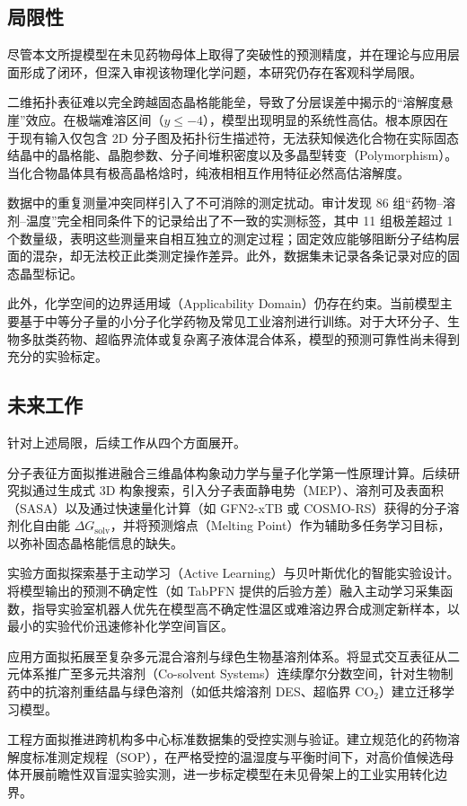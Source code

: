 \subsection{局限性}

尽管本文所提模型在未见药物母体上取得了突破性的预测精度，并在理论与应用层面形成了闭环，但深入审视该物理化学问题，本研究仍存在客观科学局限。

二维拓扑表征难以完全跨越固态晶格能能垒，导致了分层误差中揭示的“溶解度悬崖”效应。在极端难溶区间（$y \leqslant -4$），模型出现明显的系统性高估。根本原因在于现有输入仅包含 2D 分子图及拓扑衍生描述符，无法获知候选化合物在实际固态结晶中的晶格能、晶胞参数、分子间堆积密度以及多晶型转变（Polymorphism）。当化合物晶体具有极高晶格焓时，纯液相相互作用特征必然高估溶解度。

数据中的重复测量冲突同样引入了不可消除的测定扰动。审计发现 86 组“药物--溶剂--温度”完全相同条件下的记录给出了不一致的实测标签，其中 11 组极差超过 1 个数量级，表明这些测量来自相互独立的测定过程；固定效应能够阻断分子结构层面的混杂，却无法校正此类测定操作差异。此外，数据集未记录各条记录对应的固态晶型标记。

此外，化学空间的边界适用域（Applicability Domain）仍存在约束。当前模型主要基于中等分子量的小分子化学药物及常见工业溶剂进行训练。对于大环分子、生物多肽类药物、超临界流体或复杂离子液体混合体系，模型的预测可靠性尚未得到充分的实验标定。

\subsection{未来工作}

针对上述局限，后续工作从四个方面展开。

分子表征方面拟推进融合三维晶体构象动力学与量子化学第一性原理计算。后续研究拟通过生成式 3D 构象搜索，引入分子表面静电势（MEP）、溶剂可及表面积（SASA）以及通过快速量化计算（如 GFN2-xTB 或 COSMO-RS）获得的分子溶剂化自由能 $\Delta G_{\mathrm{solv}}$，并将预测熔点（Melting Point）作为辅助多任务学习目标，以弥补固态晶格能信息的缺失。

实验方面拟探索基于主动学习（Active Learning）与贝叶斯优化的智能实验设计。将模型输出的预测不确定性（如 TabPFN 提供的后验方差）融入主动学习采集函数，指导实验室机器人优先在模型高不确定性温区或难溶边界合成测定新样本，以最小的实验代价迅速修补化学空间盲区。

应用方面拟拓展至复杂多元混合溶剂与绿色生物基溶剂体系。将显式交互表征从二元体系推广至多元共溶剂（Co-solvent Systems）连续摩尔分数空间，针对生物制药中的抗溶剂重结晶与绿色溶剂（如低共熔溶剂 DES、超临界 $\mathrm{CO}_2$）建立迁移学习模型。

工程方面拟推进跨机构多中心标准数据集的受控实测与验证。建立规范化的药物溶解度标准测定规程（SOP），在严格受控的温湿度与平衡时间下，对高价值候选母体开展前瞻性双盲湿实验实测，进一步标定模型在未见骨架上的工业实用转化边界。